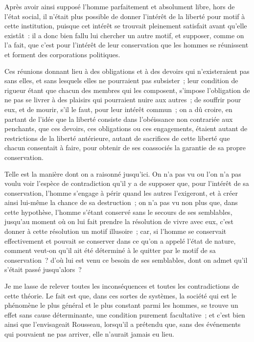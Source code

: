 \documentclass[french,twoside]{book} %
\begin{document}
Après avoir ainsi supposé l’homme parfaitement et absolument libre, hors de l’état social, il n’était plus possible de donner l’intérêt de la liberté pour motif à cette institution, puisque cet intérêt se trouvait pleinement satisfait avant qu’elle existât : il a donc bien fallu lui chercher un autre motif, et supposer, comme on l’a fait, que c’est pour l’intérêt de leur conservation que les hommes se réunissent et forment des corporations politiques.\par
Ces réunions donnant lieu à des obligations et à des devoirs qui n’existeraient pas sans elles, et sans lesquels elles ne pourraient pas subsister ; leur condition de rigueur étant que chacun des membres qui les composent, s’impose l’obligation de ne pas se livrer à des plaisirs qui pourraient nuire aux autres ; de souffrir pour eux, et de mourir, s’il le faut, pour leur intérêt commun ; on a dû croire, en partant de l’idée que la liberté consiste dans l’obéissance non contrariée aux penchants, que ces devoirs, ces obligations ou ces engagements, étaient autant de restrictions de la liberté antérieure, autant de sacrifices de cette liberté que chacun consentait à faire, pour obtenir de ses coassociés la garantie de sa propre conservation.\par
Telle est la manière dont on a raisonné jusqu’ici. On n’a pas vu ou l’on n’a pas voulu voir l’espèce de contradiction qu’il y a de supposer que, pour l’intérêt de sa conservation, l’homme s’engage à périr quand les autres l’exigeront, et à créer ainsi lui-même la chance de sa destruction ; on n’a pas vu non plus que, dans cette hypothèse, l’homme s’étant conservé sans le secours de ses semblables, jusqu’au moment où on lui fait prendre la résolution de vivre avec eux, c’est donner à cette résolution un motif illusoire ; car, si l’homme se conservait effectivement et pouvait se conserver dans ce qu’on a appelé l’état de nature, comment veut-on qu’il ait été déterminé à le quitter par le motif de sa conservation ? d’où lui est venu ce besoin de ses semblables, dont on admet qu’il s’était passé jusqu’alors ?\par
Je me lasse de relever toutes les inconséquences et toutes les contradictions de cette théorie. Le fait est que, dans ces sortes de systèmes, la société qui est le phénomène le plus général et le plus constant parmi les hommes, se trouve un effet sans cause déterminante, une condition purement facultative ; et c’est bien ainsi que l’envisageait Rousseau, lorsqu’il a prétendu que, sans des événements qui pouvaient ne pas arriver, elle n’aurait jamais eu lieu.\par
\end{document}
